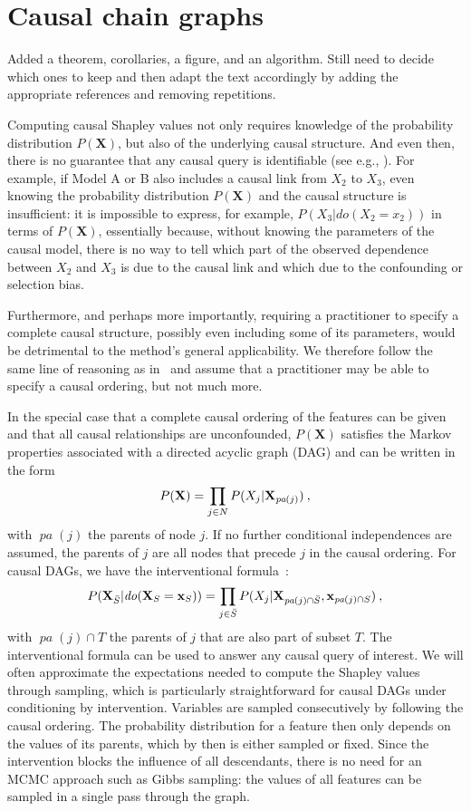 \documentclass{article}
\newcommand{\vX}{\mathbf{X}}
\newcommand{\vx}{\mathbf{x}}
\newcommand{\dodo}{\mathit{do}}
\newcommand{\ldo}[1]{\dodo(X_{#1} = x_{#1})}
\newcommand{\lvdo}[1]{\dodo(\vX_{#1} = \vx_{#1})}
\newcommand{\pa}{\mathop{\textit{pa}}}
\newcommand{\spa}{\mathop{\textit{\scriptsize pa}}}
\newcommand{\allfeatures}{{N}}
\newcommand{\comment}[1]{{\color{red} #1}}
\begin{document}
\section{Causal chain graphs}

\comment{Added a theorem, corollaries, a figure, and an algorithm. Still need to decide which ones to keep and then adapt the text accordingly by adding the appropriate references and removing repetitions.}

Computing causal Shapley values not only requires knowledge of the probability distribution $P(\vX)$, but also of the underlying causal structure. And even then, there is no guarantee that any causal query is identifiable (see e.g., \cite{pearl2012calculus}). For example, if Model A or B also includes a causal link from $X_2$ to $X_3$, even knowing the probability distribution $P(\vX)$ and the causal structure is insufficient: it is impossible to express, for example, $P(X_3|\ldo{2})$ in terms of $P(\vX)$, essentially because, without knowing the parameters of the causal model, there is no way to tell which part of the observed dependence between $X_2$ and $X_3$ is due to the causal link and which due to the confounding or selection bias.

Furthermore, and perhaps more importantly, requiring a practitioner to specify a complete causal structure, possibly even including some of its parameters, would be detrimental to the method's general applicability. We therefore follow the same line of reasoning as in~\cite{frye2019asymmetric} and assume that a practitioner may be able to specify a causal ordering, but not much more.

In the special case that a complete causal ordering of the features can be given and that all causal relationships are unconfounded, $P(\vX)$ satisfies the Markov properties associated with a directed acyclic graph (DAG) and can be written in the form
\[
P(\vX) = \prod_{j \in \allfeatures} P(X_j|\vX_{\spa(j)}) \: ,
\]
with $\pa(j)$ the parents of node $j$. If no further conditional independences are assumed, the parents of $j$ are all nodes that precede $j$ in the causal ordering. For causal DAGs, we have the interventional formula~\cite{lauritzen2002chain}:
\begin{equation}
P(\vX_{\bar{S}}|\lvdo{S}) = \prod_{j \in \bar{S}} P(X_j|\vX_{\spa(j)  \cap \bar{S}},\vx_{\spa(j) \cap S}) \: ,
\label{eq:interventional}
\end{equation}
with $\pa(j) \cap T$ the parents of $j$ that are also part of subset $T$. The interventional formula can be used to answer any causal query of interest. We will often approximate the expectations needed to compute the Shapley values through sampling, which is particularly straightforward for causal DAGs under conditioning by intervention. Variables are sampled consecutively by following the causal ordering. The probability distribution for a feature then only depends on the values of its parents, which by then is either sampled or fixed. Since the intervention blocks the influence of all descendants, there is no need for an MCMC approach such as Gibbs sampling: the values of all features can be sampled in a single pass through the graph.
\end{document}
